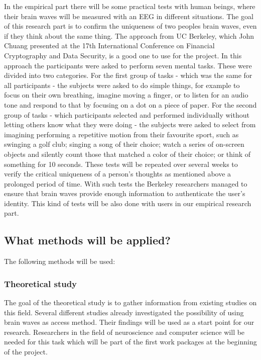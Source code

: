 In the empirical part there will be some practical tests with human beings, where their brain waves will be measured with an EEG in different situations. The goal of this research part is to confirm the uniqueness of two peoples brain waves, even if they think about the same thing. The approach from UC Berkeley, which John Chuang presented at the 17th International Conference on Financial Cryptography and Data Security, is a good one to use for the project. In this approach the participants were asked to perform seven mental tasks. These were divided into two categories. For the first group of tasks - which was the same for all participants - the subjects were asked to do simple things, for example to focus on their own breathing, imagine moving a finger, or to listen for an audio tone and respond to that by focusing on a dot on a piece of paper. For the second group of tasks - which participants selected and performed individually without letting others know what they were doing - the subjects were asked to select from imagining performing a repetitive motion from their favourite sport, such as swinging a golf club; singing a song of their choice; watch a series of on-screen objects and silently count those that matched a color of their choice; or think of something for 10 seconds. \cite{Adhikari13} These tests will be repeated over several weeks to verify the critical uniqueness of a person's thoughts as mentioned above a prolonged period of time. With such tests the Berkeley researchers managed to ensure that brain waves provide enough information to authenticate the user's identity. This kind of tests will be also done with users in our empirical research part.

\subsection{What methods will be applied?}
The following methods will be used:

\subsubsection{Theoretical study}
The goal of the theoretical study is to gather information from existing studies on this field. Several different studies already investigated the possibility of using brain waves as access method. Their findings will be used as a start point for our research. Researchers in the field of neuroscience and computer science will be needed for this task which will be part of the first work packages at the beginning of the project.

